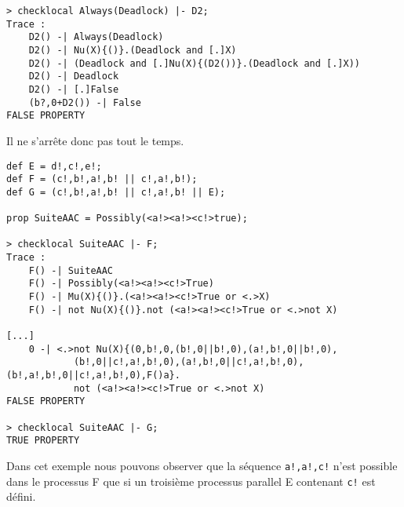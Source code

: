 \documentclass[a4paper]{article}
\begin{document}
\begin{verbatim}
> checklocal Always(Deadlock) |- D2;
Trace : 
	D2() -| Always(Deadlock)
	D2() -| Nu(X){()}.(Deadlock and [.]X)
	D2() -| (Deadlock and [.]Nu(X){(D2())}.(Deadlock and [.]X))
	D2() -| Deadlock
	D2() -| [.]False
	(b?,0+D2()) -| False
FALSE PROPERTY

\end{verbatim}

Il ne s'arrête donc pas tout le temps.

\begin{verbatim}
def E = d!,c!,e!;
def F = (c!,b!,a!,b! || c!,a!,b!);
def G = (c!,b!,a!,b! || c!,a!,b! || E);

prop SuiteAAC = Possibly(<a!><a!><c!>true);

> checklocal SuiteAAC |- F;
Trace : 
	F() -| SuiteAAC
	F() -| Possibly(<a!><a!><c!>True)
	F() -| Mu(X){()}.(<a!><a!><c!>True or <.>X)
	F() -| not Nu(X){()}.not (<a!><a!><c!>True or <.>not X)

[...]
	0 -| <.>not Nu(X){(0,b!,0,(b!,0||b!,0),(a!,b!,0||b!,0),
            (b!,0||c!,a!,b!,0),(a!,b!,0||c!,a!,b!,0),(b!,a!,b!,0||c!,a!,b!,0),F()a}.
            not (<a!><a!><c!>True or <.>not X)
FALSE PROPERTY

> checklocal SuiteAAC |- G;
TRUE PROPERTY
\end{verbatim}

Dans cet exemple nous pouvons observer que la séquence \texttt{a!,a!,c!} n'est 
possible dans le processus F que si un troisième processus parallel E contenant
\texttt{c!} est défini.
\end{document}
